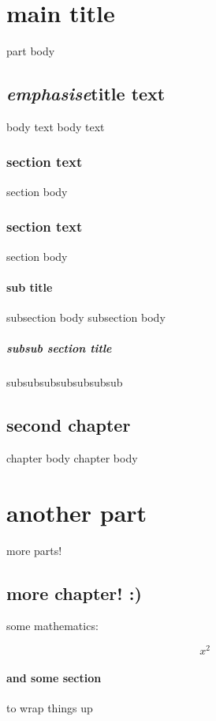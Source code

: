 \begin{myenv}
	\part{main title} 

		part body

		\chapter{\emph{emphasise}title text} 

		 body text body text

		 \section{section text} 

		  section body

		 \section{section text} 

		  section body

		  \subsection{sub title}

			  subsection body subsection body

			  \subsubsection{subsub section title}

				  subsubsubsubsubsubsub

		\chapter{second chapter} 

		 chapter body chapter body

	\part{another part} 

		more parts!

		\chapter{more chapter! :)}

		 some mathematics:

		 \[

			 x^2

		 \]

		 \subsection{and some section}

			 to wrap things up
\end{myenv}

